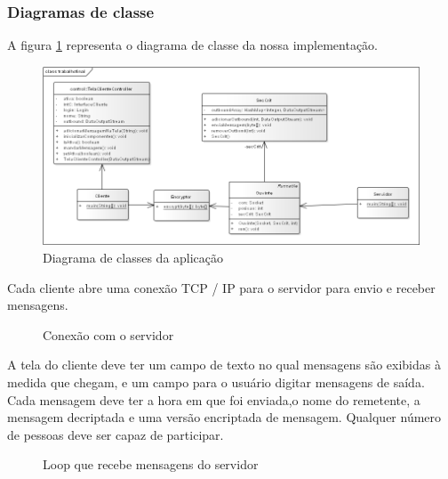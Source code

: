 \documentclass[a4paper,12pt]{article}
\begin{document}
\subsubsection{Diagramas de classe}
A figura \ref{fig2} representa o diagrama de classe da nossa implementação.
\begin{figure}[H]
\includegraphics[scale=0.4]{img/class.png}    
\caption{Diagrama de classes da aplicação}
\centering
\label{fig2}
\end{figure} 
Cada cliente abre uma conexão TCP / IP para o servidor para envio e receber mensagens.
\begin{figure}[H]
	
	\caption{Conexão com o servidor}
\end{figure}
A tela do cliente deve ter um campo de texto no qual mensagens são exibidas à medida que chegam, e um campo para o usuário digitar mensagens de saída. Cada mensagem deve ter a hora em que foi enviada,o nome do remetente, a mensagem decriptada e uma versão encriptada de mensagem. Qualquer número de pessoas deve ser capaz de participar.
\begin{figure}[H]

\caption{Loop que recebe mensagens do servidor}
\end{figure}
\end{document}

